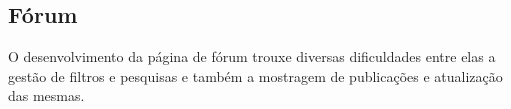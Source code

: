 \subsection{Fórum}
O desenvolvimento da página de fórum trouxe diversas dificuldades entre elas a gestão de filtros e pesquisas e também a mostragem de publicações e atualização das mesmas.


\vspace{10mm}
\begin{figure}[htb]%
  \centering
  \qquad
  \label{fig:71}%
\end{figure}
\vspace{10mm}

\newpage

